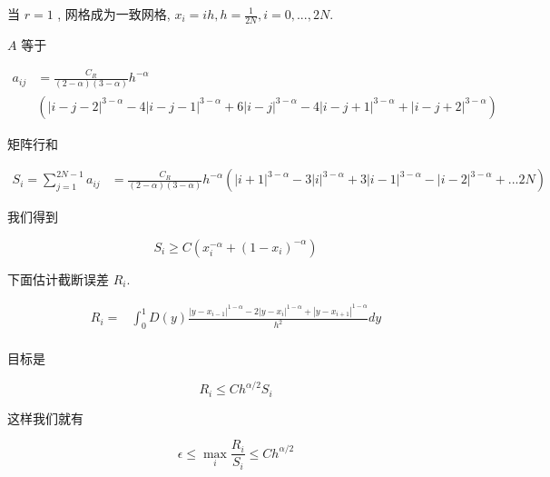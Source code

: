 \documentclass{ctexart}
\begin{document}
当 \(r=1\) , 网格成为一致网格, \(x_i = ih, h=\frac{1}{2N}, i=0, ..., 2N\).

\(A\) 等于

\begin{equation}
    \begin{aligned}
        a_{ij} & = \frac{C_R}{(2-\alpha)(3-\alpha)} h^{-\alpha}                                                                             \\
               & \left( |i-j-2|^{3-\alpha} - 4 |i-j-1|^{3-\alpha} + 6 |i-j|^{3-\alpha} - 4 |i-j+1|^{3-\alpha} +  |i-j+2|^{3-\alpha} \right)
    \end{aligned}
\end{equation}

矩阵行和

\begin{equation}
    \begin{aligned}
        S_i = \sum_{j=1}^{2N-1} a_{ij} & = \frac{C_R}{(2-\alpha)(3-\alpha)} h^{-\alpha}
        ( |i+1|^{3-\alpha} - 3 |i|^{3-\alpha} + 3 |i-1|^{3-\alpha} - |i-2|^{3-\alpha}  + ... 2N )
    \end{aligned}
\end{equation}


我们得到

\begin{equation}
    S_i \ge  C (x_i^{-\alpha} + (1-x_i)^{-\alpha})
\end{equation}


下面估计截断误差 \(R_i\).

\begin{equation}
    \begin{aligned}
        R_i = & \int_0^1 D(y) \frac{ |y-x_{i-1}|^{1-\alpha} - 2|y-x_i |^{1-\alpha} + |y-x_{i+1}|^{1-\alpha} }{h^2} dy \\
    \end{aligned}
\end{equation}



目标是

\begin{equation}
    R_i \le C h^{\alpha/2} S_i
\end{equation}

这样我们就有

\begin{equation}
    \epsilon \le \max_i \frac{R_i}{S_i} \le Ch^{\alpha/2}
\end{equation}
\end{document}
